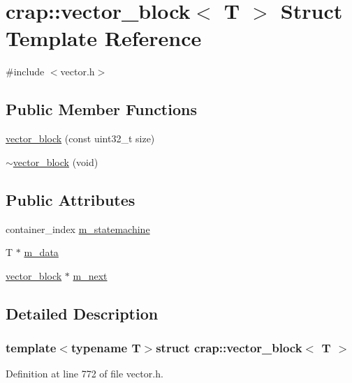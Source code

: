 \hypertarget{structcrap_1_1vector__block}{\section{crap\+:\+:vector\+\_\+block$<$ T $>$ Struct Template Reference}
\label{structcrap_1_1vector__block}
}


{\ttfamily \#include $<$vector.\+h$>$}

\subsection*{Public Member Functions}
\begin{DoxyCompactItemize}
\item 
\hyperlink{structcrap_1_1vector__block_aa26e01d5ec803b9a712275913aed400b}{vector\+\_\+block} (const uint32\+\_\+t size)
\item 
\hyperlink{structcrap_1_1vector__block_a9c4c9a96310f3401685b4e2ed9aecfc0}{$\sim$vector\+\_\+block} (void)
\end{DoxyCompactItemize}
\subsection*{Public Attributes}
\begin{DoxyCompactItemize}
\item 
container\+\_\+index \hyperlink{structcrap_1_1vector__block_a9a677e8f67671c6fd2079eaa5d21bfb5}{m\+\_\+statemachine}
\item 
T $\ast$ \hyperlink{structcrap_1_1vector__block_a0bf87e9fe1f22557b5f93759e80f364a}{m\+\_\+data}
\item 
\hyperlink{structcrap_1_1vector__block}{vector\+\_\+block} $\ast$ \hyperlink{structcrap_1_1vector__block_a7eb66a312dc9bb9c5e7b57ab640d05e8}{m\+\_\+next}
\end{DoxyCompactItemize}


\subsection{Detailed Description}
\subsubsection*{template$<$typename T$>$struct crap\+::vector\+\_\+block$<$ T $>$}



Definition at line 772 of file vector.\+h.



